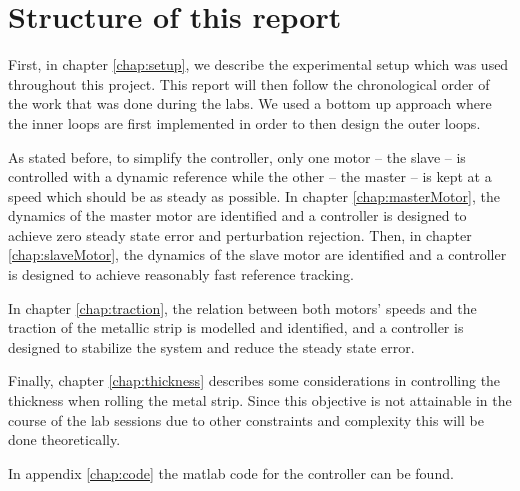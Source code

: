 \section{Structure of this report}
First, in chapter \ref{chap:setup}, we describe the experimental setup which was used throughout this project. This report will then follow the chronological order of the work that was done during the labs. We used a bottom up approach where the inner loops are first implemented in order to then design the outer loops.

As stated before, to simplify the controller, only one motor -- the slave -- is controlled with a dynamic reference while the other -- the master -- is kept at a speed which should be as steady as possible. In chapter \ref{chap:masterMotor}, the dynamics of the master motor are identified and a controller is designed to achieve zero steady state error and perturbation rejection. Then, in chapter \ref{chap:slaveMotor}, the dynamics of the slave motor are identified and a controller is designed to achieve reasonably fast reference tracking.

In chapter \ref{chap:traction}, the relation between both motors' speeds and the traction of the metallic strip is modelled and identified, and a controller is designed to stabilize the system and reduce the steady state error.

Finally, chapter \ref{chap:thickness} describes some considerations in controlling the thickness when rolling the metal strip. Since this objective is not attainable in the course of the lab sessions due to other constraints and complexity this will be done theoretically.

In appendix \ref{chap:code} the matlab code for the controller can be found.
